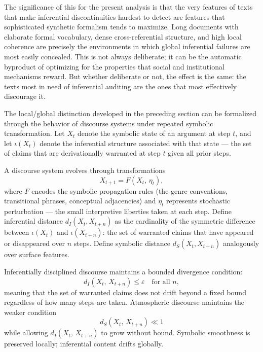 \documentclass[12pt, openright, twoside]{book}
\begin{document}
The significance of this for the present analysis is that the very features
of texts that make inferential discontinuities hardest to detect are features
that sophisticated synthetic formalism tends to maximize. Long documents with
elaborate formal vocabulary, dense cross-referential structure, and high
local coherence are precisely the environments in which global inferential
failures are most easily concealed. This is not always deliberate; it can
be the automatic byproduct of optimizing for the properties that social
and institutional mechanisms reward. But whether deliberate or not, the
effect is the same: the texts most in need of inferential auditing are the
ones that most effectively discourage it.





\begin{technicalnote}[title={Technical Note: Inferential Stability and Symbolic Drift}]

The local/global distinction developed in the preceding section can be formalized
through the behavior of discourse systems under repeated symbolic transformation.
Let $X_t$ denote the symbolic state of an argument at step $t$, and let $\iota(X_t)$
denote the inferential structure associated with that state --- the set of claims
that are derivationally warranted at step $t$ given all prior steps.

A discourse system evolves through transformations
\[
X_{t+1} = F(X_t,\, \eta_t),
\]
where $F$ encodes the symbolic propagation rules (the genre conventions, transitional
phrases, conceptual adjacencies) and $\eta_t$ represents stochastic perturbation ---
the small interpretive liberties taken at each step. Define inferential distance
$d_I(X_t, X_{t+n})$ as the cardinality of the symmetric difference between
$\iota(X_t)$ and $\iota(X_{t+n})$: the set of warranted claims that have appeared
or disappeared over $n$ steps. Define symbolic distance $d_S(X_t, X_{t+n})$
analogously over surface features.

Inferentially disciplined discourse maintains a bounded divergence condition:
\[
d_I(X_t,\, X_{t+n}) \leq \varepsilon \quad \text{for all } n,
\]
meaning that the set of warranted claims does not drift beyond a fixed bound regardless
of how many steps are taken. Atmospheric discourse maintains the weaker condition
\[
d_S(X_t,\, X_{t+n}) \ll 1
\]
while allowing $d_I(X_t,\, X_{t+n})$ to grow without bound. Symbolic smoothness
is preserved locally; inferential content drifts globally.


\end{technicalnote}
\end{document}
